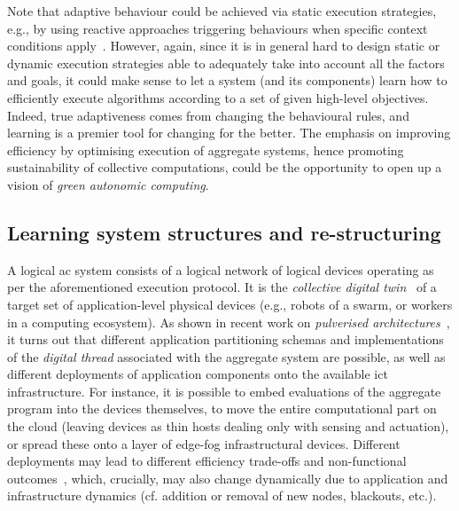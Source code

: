 Note that adaptive behaviour
 could be achieved via static execution strategies, e.g., by using reactive approaches triggering behaviours when specific context conditions apply~\cite{danilo2021lmcs}.
%
However, again, 
 since it is in general hard to design static or dynamic execution strategies 
 able to adequately take into account all the factors and goals,
 it could make sense to let a system (and its components) learn 
 how to efficiently execute algorithms 
 according to a set of given high-level objectives.
%
Indeed, true adaptiveness 
 comes from changing the behavioural rules,
 and learning is a premier tool for 
 changing for the better.
%
The emphasis on improving efficiency
 by optimising execution 
 of aggregate systems,
 hence promoting sustainability
 of collective computations,
 could be the opportunity to open up a vision 
 of \emph{green autonomic computing}.

 
 
\subsection{Learning system structures and re-structuring}

A logical \ac{ac} system 
 consists of a logical network
 of logical devices
 operating as per the aforementioned execution protocol.
%
It is the \emph{collective digital twin}~\cite{casadei2022applsci}
 of a target set of application-level physical devices (e.g., robots of a swarm, or workers in a computing ecosystem).
%
As shown in recent work on \emph{pulverised architectures}~\cite{DBLP:journals/fi/CasadeiPPVW20},
 it turns out that different application partitioning schemas and implementations of the \emph{digital thread} associated with the aggregate system are possible,
 as well as different deployments
 of application components
 onto the available \ac{ict} infrastructure.
%
%
For instance,
 it is possible to embed evaluations of the aggregate program into the devices themselves,
 to move the entire computational part on the cloud (leaving devices as thin hosts dealing only with sensing and actuation),
 or spread these onto a layer of edge-fog infrastructural devices.
%
Different deployments 
 may lead to different efficiency trade-offs
 and non-functional outcomes~\cite{DBLP:journals/fi/CasadeiPPVW20,casadei2022applsci},
 which, crucially, may also change dynamically 
 due to application and infrastructure dynamics
 (cf. addition or removal of new nodes, blackouts, etc.).
 

